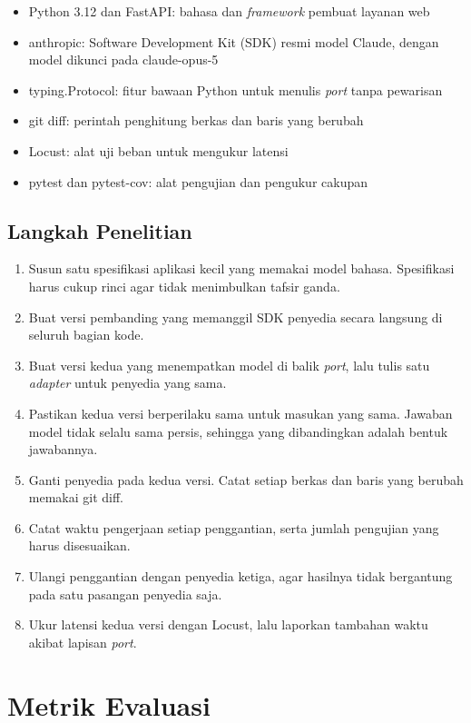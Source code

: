 \documentclass[11pt,a4paper]{article}
\begin{document}
\begin{itemize}[leftmargin=*]
  \item Python 3.12 dan FastAPI: bahasa dan \textit{framework} pembuat layanan web
  \item anthropic: Software Development Kit (SDK) resmi model Claude, dengan model dikunci pada claude-opus-5
  \item typing.Protocol: fitur bawaan Python untuk menulis \textit{port} tanpa pewarisan
  \item git diff: perintah penghitung berkas dan baris yang berubah
  \item Locust: alat uji beban untuk mengukur latensi
  \item pytest dan pytest-cov: alat pengujian dan pengukur cakupan
\end{itemize}

\subsection{Langkah Penelitian}

\begin{enumerate}[leftmargin=*]
  \item Susun satu spesifikasi aplikasi kecil yang memakai model bahasa. Spesifikasi harus cukup rinci agar tidak menimbulkan tafsir ganda.
  \item Buat versi pembanding yang memanggil SDK penyedia secara langsung di seluruh bagian kode.
  \item Buat versi kedua yang menempatkan model di balik \textit{port}, lalu tulis satu \textit{adapter} untuk penyedia yang sama.
  \item Pastikan kedua versi berperilaku sama untuk masukan yang sama. Jawaban model tidak selalu sama persis, sehingga yang dibandingkan adalah bentuk jawabannya.
  \item Ganti penyedia pada kedua versi. Catat setiap berkas dan baris yang berubah memakai git diff.
  \item Catat waktu pengerjaan setiap penggantian, serta jumlah pengujian yang harus disesuaikan.
  \item Ulangi penggantian dengan penyedia ketiga, agar hasilnya tidak bergantung pada satu pasangan penyedia saja.
  \item Ukur latensi kedua versi dengan Locust, lalu laporkan tambahan waktu akibat lapisan \textit{port}.
\end{enumerate}

\section{Metrik Evaluasi}
\end{document}
